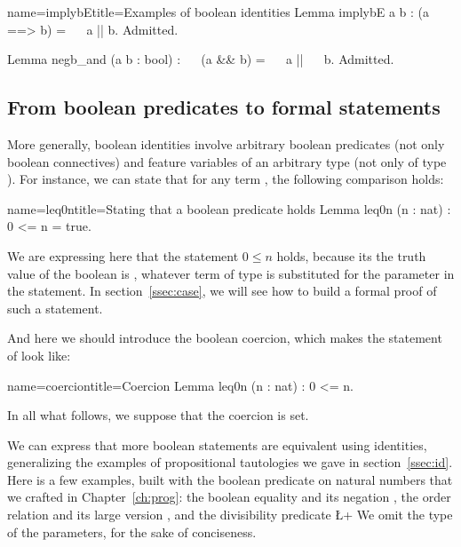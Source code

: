 \begin{coq}{name=implybE}{title=Examples of boolean identities}
Lemma implybE a b : (a ==> b) = ~~ a || b.
Admitted.

Lemma negb_and (a b : bool) : ~~ (a && b) = ~~ a || ~~ b.
Admitted.
\end{coq}



\subsection{From boolean predicates to formal statements}

More generally, boolean identities involve arbitrary boolean
predicates (not only boolean connectives) and feature variables of
an arbitrary type (not only of type ).
 For instance, we can state
that for any term , the following comparison holds:

\begin{coq}{name=leq0n}{title=Stating that a boolean predicate holds}
Lemma leq0n (n : nat) : 0 <= n = true.
\end{coq}
We are expressing here that the statement $0 \leq n$ holds, because
its the truth value of the boolean  is , whatever
term  of type  is substituted for the parameter  in the
statement. In section~\ref{ssec:case}, we will see how to build a
formal proof of such a statement.


And here we should introduce the boolean coercion, which makes the
statement of  look like:

\begin{coq}{name=coercion}{title=Coercion}
Lemma leq0n (n : nat) : 0 <= n.
\end{coq}

In all what follows, we suppose that the coercion is set.

We can express that more boolean statements are equivalent using
identities, generalizing the examples of propositional tautologies we
gave in section~\ref{ssec:id}. Here is a few examples, built with the
boolean predicate on natural numbers that we crafted in
Chapter~\ref{ch:prog}: the boolean equality \C{==} and its negation
\C{!=}, the order relation \C{<} and its large version \C{<=}, and the
divisibility predicate \L+%
We omit the type of the parameters, for the sake of
conciseness.


